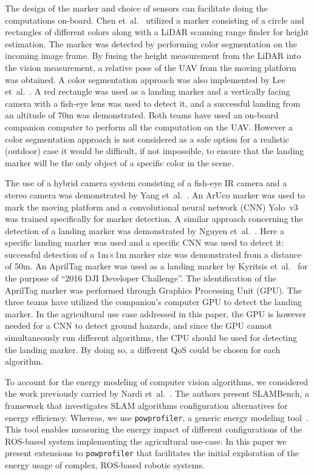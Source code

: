 \documentclass[conference]{IEEEtran}
\newcommand{\stt}[1]{{\small\tt #1}} %
\newcommand{\powprof}{\stt{powprofiler}}
\begin{document}
The design of the marker and choice of sensors can facilitate doing the computations on-board. %
%
Chen et~al.~\cite{chen2016system} utilized a marker consisting of a circle and rectangles of different colors along with a LiDAR scanning range finder for height estimation. The marker was detected by performing color segmentation on the incoming image frame. By fusing the height measurement from the LiDAR into the vision measurement, a relative pose of the UAV from the moving platform was obtained. A color segmentation approach was also implemented by Lee et~al.~\cite{lee2016vision}. A red rectangle was used as a landing marker and a vertically facing camera with a fish-eye lens was used to detect it, and a successful landing from an altitude of 70m was demonstrated. Both teams have used an on-board companion computer to perform all the computation on the UAV. However a color segmentation approach is not considered as a safe option for a realistic (outdoor) case it would be difficult, if not impossible, to ensure that the landing marker will be the only object of a specific color in the scene.

The use of a hybrid camera system consisting of a fish-eye IR camera and a stereo camera was demonstrated by Yang et~al.~\cite{yang2018hybrid}. An ArUco marker was used to mark the moving platform and a convolutional neural network (CNN) Yolo~v3 was trained specifically for marker detection. A similar approach concerning the detection of a landing marker was demonstrated by Nguyen et~al.~\cite{nguyen2018lightdenseyolo}. Here a specific landing marker was used and a specific CNN was used to detect it: successful detection of a 1m$\times$1m marker size was demonstrated from a distance of 50m. An AprilTag marker was used as a landing marker by Kyritsis et~al.~\cite{kyristsis2016towards} for the purpose of ``2016 DJI Developer Challenge''. The identification of the AprilTag marker was performed through Graphics Processing Unit (GPU). The three teams have utilized the companion's computer GPU to detect the landing marker. In the agricultural use case addressed in this paper, the GPU is however needed for a CNN to detect ground hazards, and since the GPU cannot simultaneously run different algorithms, %
the CPU should be used for detecting the landing marker. By doing so, a different QoS could be chosen for each algorithm.    

To account for the energy modeling of computer vision algorithms, we considered the work previously carried by Nardi et~al.~\cite{nardi2015introducing}. The authors present SLAMBench, a framework that investigates SLAM algorithms configuration alternatives for energy efficiency. Whereas, we use \powprof{}, a generic energy modeling tool~\cite{seewald2019coarse}. This tool enables measuring the energy impact of different configurations of the ROS-based system implementing the agricultural use-case. In this paper we present extensions to \powprof{} that facilitates the initial exploration of the energy usage of complex, ROS-based robotic systems.
\end{document}
